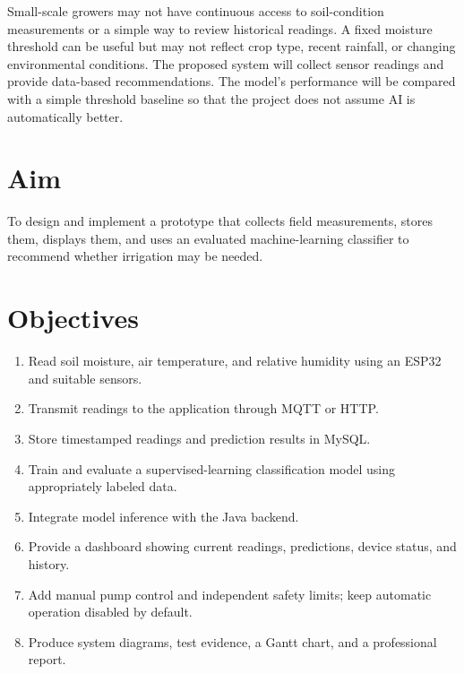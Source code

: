 \documentclass[12pt,a4paper]{report}
\begin{document}
Small-scale growers may not have continuous access to soil-condition measurements or a simple way to review historical readings. A fixed moisture threshold can be useful but may not reflect crop type, recent rainfall, or changing environmental conditions. The proposed system will collect sensor readings and provide data-based recommendations. The model's performance will be compared with a simple threshold baseline so that the project does not assume AI is automatically better.

\section{Aim}

To design and implement a prototype that collects field measurements, stores them, displays them, and uses an evaluated machine-learning classifier to recommend whether irrigation may be needed.

\section{Objectives}

\begin{enumerate}[leftmargin=*]

\item Read soil moisture, air temperature, and relative humidity using an ESP32 and suitable sensors.

\item Transmit readings to the application through MQTT or HTTP.

\item Store timestamped readings and prediction results in MySQL.

\item Train and evaluate a supervised-learning classification model using appropriately labeled data.

\item Integrate model inference with the Java backend.

\item Provide a dashboard showing current readings, predictions, device status, and history.

\item Add manual pump control and independent safety limits; keep automatic operation disabled by default.

\item Produce system diagrams, test evidence, a Gantt chart, and a professional report.

\end{enumerate}
\end{document}
